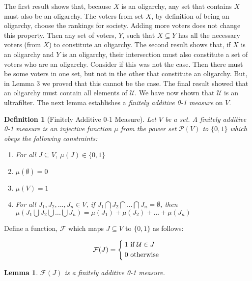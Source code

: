 \documentclass{amsart}
\newtheorem{definition}{Definition}
\newtheorem{lemma}{Lemma}
\theoremstyle{plain}
\begin{document}
The first result shows that, because $X$ is an oligarchy, any set that contains $X$ must also be an oligarchy. The voters from set $X$, by definition of being an oligarchy, choose the rankings for society. Adding more voters does not change this property. Then any set of voters, $Y$, such that $X \subseteq Y$ has all the necessary voters (from $X$) to constitute an oligarchy. The second result shows that, if $X$ is an oligarchy and $Y$ is an oligarchy, their intersection must also constitute a set of voters who are an oligarchy. Consider if this was not the case. Then there must be some voters in one set, but not in the other that constitute an oligarchy. But, in Lemma 3 we proved that this cannot be the case. The final result showed that an oligarchy must contain all elements of $\mathcal{U}$. We have now shown that $\mathcal{U}$ is an ultrafilter. The next lemma establishes a \emph{finitely additive 0-1 measure} on $V$.


\begin{definition}[Finitely Additive 0-1 Measure]
    Let $V$ be a set. A finitely additive 0-1 measure is an injective function $\mu$ from the power set $\mathcal{P}(V)$ to $\{0,1\}$ which obeys the following constraints:

    \begin{enumerate}
        \item For all $J \subseteq V$, $\mu(J) \in \{0,1\}$
        \item $\mu(\emptyset) = 0$
        \item $\mu(V) = 1$
        \item For all $J_1, J_2, ... , J_n \in V$, if $J_1 \bigcap J_2 \bigcap ... \bigcap J_n = \emptyset$, then $\mu(J_1 \bigcup J_2 \bigcup ... \bigcup J_n) = \mu(J_1) + \mu(J_2) + ... + \mu(J_n)$
    \end{enumerate}
\end{definition}

\noindent Define a function, $\mathcal{F}$ which maps $J \subseteq V$ to $\{0,1\}$ as follows:


\[ \mathcal{F}(J) = 
    \begin{dcases}
       \: 1 \text{ if } \mathcal{U} \in J  \\  
       \: 0 \text{ otherwise }
    \end{dcases}
\]


\begin{lemma}
    $\mathcal{F}(J)$ is a finitely additive 0-1 measure. 
\end{lemma}
\end{document}
